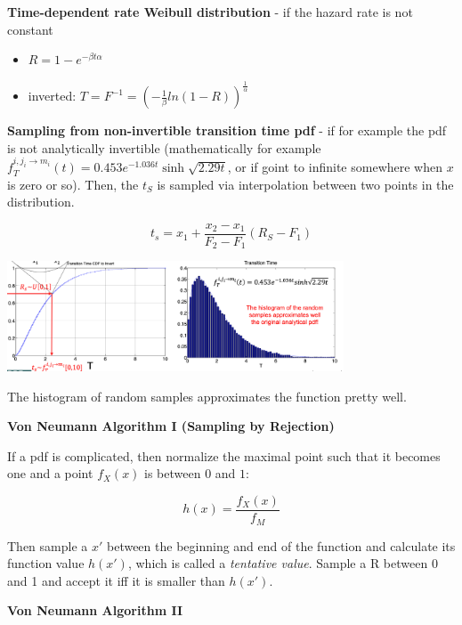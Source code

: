\documentclass[8pt, landscape, fleqn]{scrartcl}
\begin{document}
\begin{multicols*}{3}
\textbf{Time-dependent rate Weibull distribution} - if the hazard rate is not constant

\begin{itemize}
    \item $R = 1-e^{-\beta t\alpha}$
    \item inverted: $T = F^{-1} = \left(-\frac{1}{\beta} ln(1-R)\right)^{\frac{1}{\alpha}}$
\end{itemize}

\textbf{Sampling from non-invertible transition time pdf} - if for example the pdf is not analytically invertible (mathematically for example $f_T^{i,j_i \rightarrow m_i}(t) = 0.453 e^{-1.036 t}\sinh \sqrt{2.29 t}$, or if goint to infinite somewhere when $x$ is zero or so). Then, the $t_S$ is sampled via interpolation between two points in the distribution.

\begin{equation}
   t_s = x_1 + \frac{x_2 -x_1 }{F_2 - F_1 } (R_S - F_1)
\end{equation}

\includegraphics[width=10cm]{Images/SampledInterpolationNonInvertible.png}

The histogram of random samples approximates the function pretty well. \newline

\textbf{Von Neumann Algorithm I (Sampling by Rejection)} \newline

If a pdf is complicated, then normalize the maximal point such that it becomes one and a point $f_X(x)$ is between $0$ and $1$:

\begin{equation}
    h(x) = \frac{f_X(x)}{f_M}
\end{equation} 

Then sample a $x'$ between the beginning and end of the function and calculate its function value $h(x')$, which is called a \emph{tentative value}. Sample a R between 0 and 1 and accept it iff it is smaller than $h(x')$. \newline

\textbf{Von Neumann Algorithm II} \newline



\end{multicols*}
\end{document}
